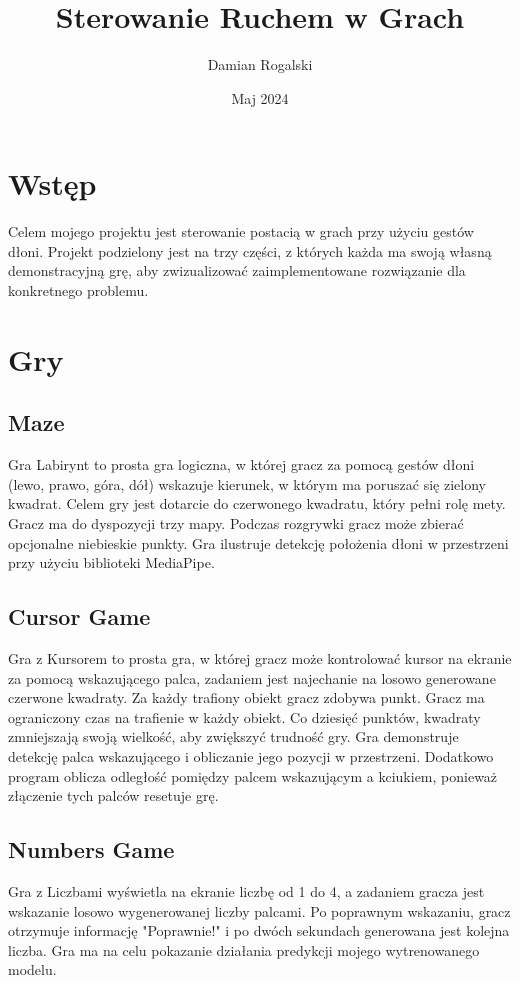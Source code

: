 \documentclass{article}
\title{Sterowanie Ruchem w Grach}
\author{Damian Rogalski}
\date{Maj 2024}
\begin{document}
\maketitle

\section{Wstęp}
Celem mojego projektu jest sterowanie postacią w grach przy użyciu gestów dłoni. Projekt podzielony jest na trzy części, z których każda ma swoją własną demonstracyjną grę, aby zwizualizować zaimplementowane rozwiązanie dla konkretnego problemu.

\section{Gry}
\subsection{Maze}
Gra Labirynt to prosta gra logiczna, w której gracz za pomocą gestów dłoni (lewo, prawo, góra, dół) wskazuje kierunek, w którym ma poruszać się zielony kwadrat. Celem gry jest dotarcie do czerwonego kwadratu, który pełni rolę mety. Gracz ma do dyspozycji trzy mapy. Podczas rozgrywki gracz może zbierać opcjonalne niebieskie punkty. Gra ilustruje detekcję położenia dłoni w przestrzeni przy użyciu biblioteki MediaPipe.

\subsection{Cursor Game}
Gra z Kursorem to prosta gra, w której gracz może kontrolować kursor na ekranie za pomocą wskazującego palca, zadaniem jest najechanie na losowo generowane czerwone kwadraty. Za każdy trafiony obiekt gracz zdobywa punkt. Gracz ma ograniczony czas na trafienie w każdy obiekt. Co dziesięć punktów, kwadraty zmniejszają swoją wielkość, aby zwiększyć trudność gry. Gra demonstruje detekcję palca wskazującego i obliczanie jego pozycji w przestrzeni. Dodatkowo program oblicza odległość pomiędzy palcem wskazującym a kciukiem, ponieważ złączenie tych palców resetuje grę.

\subsection{Numbers Game}
Gra z Liczbami wyświetla na ekranie liczbę od 1 do 4, a zadaniem gracza jest wskazanie losowo wygenerowanej liczby palcami. Po poprawnym wskazaniu, gracz otrzymuje informację "Poprawnie!" i po dwóch sekundach generowana jest kolejna liczba. Gra ma na celu pokazanie działania predykcji mojego wytrenowanego modelu.
\end{document}
